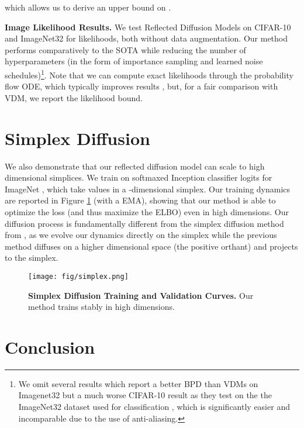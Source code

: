 \documentclass{article}
\theoremstyle{plain}
\theoremstyle{definition}
\theoremstyle{remark}
\begin{document}
which allows us to derive an upper bound on .

\textbf{Image Likelihood Results.} We test Reflected Diffusion Models on CIFAR-10 \citep{Krizhevsky2009LearningML} and ImageNet32 \citep{Oord2016PixelRN} for likelihoods, both without data augmentation. Our method performs comparatively to the SOTA while reducing the number of hyperparameters (in the form of importance sampling and learned noise schedules)\footnote{We omit several results which report a better BPD than VDMs \citep{Kingma2021VariationalDM} on Imagenet32 but a much worse CIFAR-10 result as they test on the the ImageNet32 dataset used for classification \citep{Chrabaszcz2017ADV}, which is significantly easier and incomparable due to the use of anti-aliasing.}. Note that we can compute exact likelihoods through the probability flow ODE, which typically improves results \citep{Song2021MaximumLT}, but, for a fair comparison with VDM, we report the likelihood bound.
 \section{Simplex Diffusion}

We also demonstrate that our reflected diffusion model can scale to high dimensional simplices. We train on softmaxed Inception classifier logits for ImageNet \citep{Szegedy2014GoingDW}, which take values in a -dimensional simplex. Our training dynamics are reported in Figure \ref{fig:simplexresults} (with a  EMA), showing that our method is able to optimize the loss (and thus maximize the ELBO) even in high dimensions. Our diffusion process is fundamentally different from the simplex diffusion method from \citet{Richemond2022CategoricalSW}, as we evolve our dynamics directly on the simplex while the previous method diffuses on a higher dimensional space (the positive orthant) and projects to the simplex.

\begin{figure}[t]
    \centering
    \texttt{[image: fig/simplex.png]}
    \caption{\textbf{Simplex Diffusion Training and Validation Curves.} Our method trains stably in high dimensions.}
    \label{fig:simplexresults}
    \vspace{-5mm}
\end{figure}








%
 \section{Conclusion}
\end{document}
